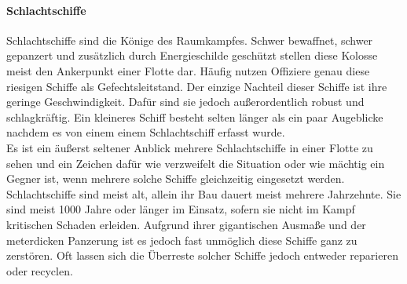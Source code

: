 \documentclass[11pt, a4paper]{article}
\begin{document}
\paragraph{Schlachtschiffe}
Schlachtschiffe sind die Könige des Raumkampfes. Schwer bewaffnet, schwer gepanzert und zusätzlich durch 
Energieschilde geschützt stellen diese Kolosse meist den Ankerpunkt einer Flotte dar. Häufig nutzen Offiziere
genau diese riesigen Schiffe als Gefechtsleitstand. Der einzige Nachteil dieser Schiffe ist ihre geringe
Geschwindigkeit. Dafür sind sie jedoch außerordentlich robust und schlagkräftig. Ein kleineres Schiff besteht 
selten länger als ein paar Augeblicke nachdem es von einem einem Schlachtschiff erfasst wurde.\\
Es ist ein äußerst seltener Anblick mehrere Schlachtschiffe in einer Flotte zu sehen und ein Zeichen dafür wie
verzweifelt die Situation oder wie mächtig ein Gegner ist, wenn mehrere solche Schiffe gleichzeitig eingesetzt
werden. Schlachtschiffe sind meist alt, allein ihr Bau dauert meist mehrere Jahrzehnte. Sie sind meist 1000
Jahre oder länger im Einsatz, sofern sie nicht im Kampf kritischen Schaden erleiden. Aufgrund ihrer 
gigantischen Ausmaße und der meterdicken Panzerung ist es jedoch fast unmöglich diese Schiffe ganz zu 
zerstören. Oft lassen sich die Überreste solcher Schiffe jedoch entweder reparieren oder recyclen.
%
\end{document}
